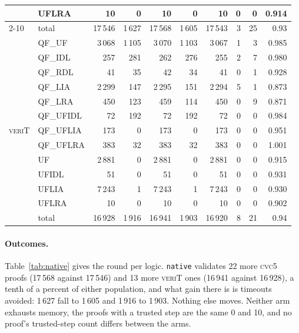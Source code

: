 \documentclass[runningheads]{llncs}
\newcommand{\cvcv}{\textsc{cvc5}\xspace}
\newcommand{\verit}{\textsc{veriT}\xspace}
\begin{document}
\begin{table}[p]
\begin{tabular}{l l r r @{\quad} r r @{\quad} r r r @{\quad} r}
      & UFLRA     &       10 &       0 &       10 &       0 &       10 &  0 &  0 & 0.914 \\
    \cmidrule(l){2-10}
      & total     &  17\,546 &  1\,627 &  17\,568 &  1\,605 &  17\,543 &  3 & 25 & 0.93 \\
    \midrule
    \multirow{13}{*}{\verit}
      & QF\_UF    &   3\,068 &  1\,105 &   3\,070 &  1\,103 &   3\,067 &  1 &  3 & 0.985 \\
      & QF\_IDL   &      257 &     281 &      262 &     276 &      255 &  2 &  7 & 0.980 \\
      & QF\_RDL   &       41 &      35 &       42 &      34 &       41 &  0 &  1 & 0.928 \\
      & QF\_LIA   &   2\,299 &     147 &   2\,295 &     151 &   2\,294 &  5 &  1 & 0.873 \\
      & QF\_LRA   &      450 &     123 &      459 &     114 &      450 &  0 &  9 & 0.871 \\
      & QF\_UFIDL &       72 &     192 &       72 &     192 &       72 &  0 &  0 & 0.984 \\
      & QF\_UFLIA &      173 &       0 &      173 &       0 &      173 &  0 &  0 & 0.951 \\
      & QF\_UFLRA &      383 &      32 &      383 &      32 &      383 &  0 &  0 & 1.001 \\
      & UF        &   2\,881 &       0 &   2\,881 &       0 &   2\,881 &  0 &  0 & 0.915 \\
      & UFIDL     &       51 &       0 &       51 &       0 &       51 &  0 &  0 & 0.931 \\
      & UFLIA     &   7\,243 &       1 &   7\,243 &       1 &   7\,243 &  0 &  0 & 0.930 \\
      & UFLRA     &       10 &       0 &       10 &       0 &       10 &  0 &  0 & 0.902 \\
    \cmidrule(l){2-10}
      & total     &  16\,928 &  1\,916 &  16\,941 &  1\,903 &  16\,920 &  8 & 21 & 0.94 \\
    \bottomrule
  \end{tabular}
\end{table}

\paragraph{Outcomes.} Table~\ref{tab:native} gives the round per logic.
\texttt{native} validates 22 more \cvcv proofs (17\,568 against 17\,546) and
13 more \verit ones (16\,941 against 16\,928), a tenth of a percent of either
population, and what gain there is is timeouts avoided: 1\,627 fall to
1\,605 and 1\,916 to 1\,903. Nothing else moves. Neither arm exhausts memory,
the proofs with a trusted step are the same 0 and 10, and no proof's
trusted-step count differs between the arms.
\end{document}
